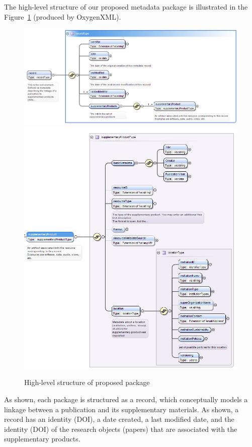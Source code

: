 The high-level structure of our proposed metadata package is illustrated in the Figure~\ref{fig:schema_v1} (produced by OxygenXML). 
\begin{figure}
	\includegraphics[width=\textwidth]{images/Selection_447.png}
	\includegraphics[width=\textwidth]{images/Selection_448.png}
	\caption{\label{fig:schema_v1}High-level structure of proposed package}
\end{figure} 
As shown, each package is structured as a record, which conceptually models a linkage between a publication and its supplementary materials.  As shown, a record has an identity (\ac{DOI}), a date created, a last modified date, and the identity (\ac{DOI}) of the research objects (papers) that are associated with the supplementary products.
